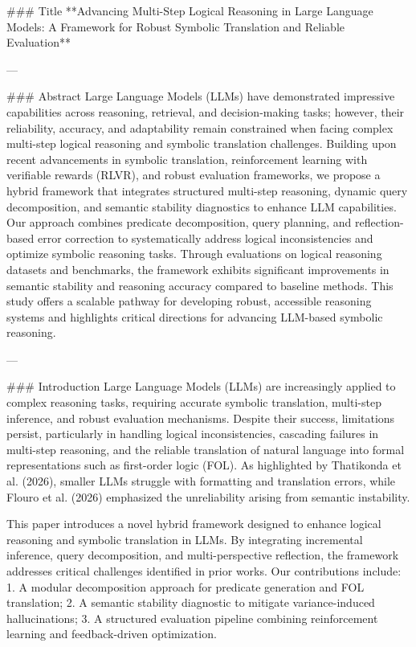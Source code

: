 ### Title  
**Advancing Multi-Step Logical Reasoning in Large Language Models: A Framework for Robust Symbolic Translation and Reliable Evaluation**

---

### Abstract  
Large Language Models (LLMs) have demonstrated impressive capabilities across reasoning, retrieval, and decision-making tasks; however, their reliability, accuracy, and adaptability remain constrained when facing complex multi-step logical reasoning and symbolic translation challenges. Building upon recent advancements in symbolic translation, reinforcement learning with verifiable rewards (RLVR), and robust evaluation frameworks, we propose a hybrid framework that integrates structured multi-step reasoning, dynamic query decomposition, and semantic stability diagnostics to enhance LLM capabilities. Our approach combines predicate decomposition, query planning, and reflection-based error correction to systematically address logical inconsistencies and optimize symbolic reasoning tasks. Through evaluations on logical reasoning datasets and benchmarks, the framework exhibits significant improvements in semantic stability and reasoning accuracy compared to baseline methods. This study offers a scalable pathway for developing robust, accessible reasoning systems and highlights critical directions for advancing LLM-based symbolic reasoning.

---

### Introduction  
Large Language Models (LLMs) are increasingly applied to complex reasoning tasks, requiring accurate symbolic translation, multi-step inference, and robust evaluation mechanisms. Despite their success, limitations persist, particularly in handling logical inconsistencies, cascading failures in multi-step reasoning, and the reliable translation of natural language into formal representations such as first-order logic (FOL). As highlighted by Thatikonda et al. (2026), smaller LLMs struggle with formatting and translation errors, while Flouro et al. (2026) emphasized the unreliability arising from semantic instability.

This paper introduces a novel hybrid framework designed to enhance logical reasoning and symbolic translation in LLMs. By integrating incremental inference, query decomposition, and multi-perspective reflection, the framework addresses critical challenges identified in prior works. Our contributions include:  
1. A modular decomposition approach for predicate generation and FOL translation;  
2. A semantic stability diagnostic to mitigate variance-induced hallucinations;  
3. A structured evaluation pipeline combining reinforcement learning and feedback-driven optimization.  


